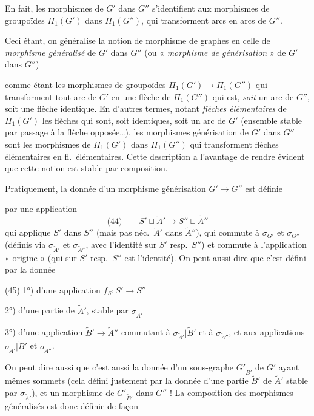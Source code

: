 \documentclass[11pt,a4paper]{article}
\begin{document}
En fait, les morphismes de $G'$ dans $G''$ s'identifient aux morphismes de groupoïdes $\Pi_1(G')$ dans $\Pi_1(G'')$, qui transforment arcs  en arcs de $G''$.

Ceci étant, on généralise la notion de morphisme de graphes en celle de \emph{morphisme généralisé} de $G'$ dans $G''$ (ou « \emph{morphisme de générisation} » de $G'$ dans $G''$)

comme étant les morphismes de groupoïdes $\Pi_1(G') \to \Pi_1(G'')$ qui transforment tout arc de $G'$ en une flèche de $\Pi_1(G'')$ qui est, \emph{soit} un arc de $G''$, soit une flèche identique. En d'autres termes, notant \emph{flèches élémentaires} de $\Pi_1(G')$ les flèches qui sont, soit identiques, soit un  arc de $G'$ (ensemble  stable par passage à la flèche opposée…), les morphismes  générisation de $G'$ dans $G''$ sont les morphismes de $\Pi_1(G')$ dans $\Pi_1(G'')$ qui transforment flèches élémentaires en fl.\ élémentaires. Cette description a l'avantage de rendre évident que cette notion est stable par composition.

Pratiquement, la donnée d'un morphisme  générisation  $G' \to G''$ est définie

par une application
\[
\text{(44)}\qquad S' \sqcup \tilde{A}' \longrightarrow S'' \sqcup \tilde{A}''
\]
qui applique $S'$ dans $S''$ (mais pas néc.\ $\tilde{A}'$ dans $\tilde{A}''$), qui commute à $\sigma_{G'}$ et $\sigma_{G''}$ (définis via $\sigma_{\tilde{A}'}$ et $\sigma_{\tilde{A}''}$, avec l'identité sur $S'$ resp.\ $S''$) et commute à l'application « origine » (qui sur $S'$ resp.\ $S''$ est l'identité). On peut aussi dire que c'est défini par la donnée

(45) 1°) d'une application $f_{S} : S' \to S''$

2°) d'une partie  de $\tilde{A}'$, stable par $\sigma_{\tilde{A}'}$

3°) d'une application $\tilde{B}' \to \tilde{A}''$ commutant à $\sigma_{\tilde{A}'} | \tilde{B}'$ et à $\sigma_{\tilde{A}''}$, et aux applications $o_{\tilde{A}'} | \tilde{B}'$ et $o_{\tilde{A}''}$.

On peut dire aussi que c'est aussi la donnée d'un sous-graphe $G'_{\tilde{B}'}$ de \struck{\ill{}} $G'$ ayant mêmes sommets (cela défini justement par la donnée d'une partie $\tilde{B}'$ de $\tilde{A}'$ stable par $\sigma_{\tilde{A}'}$), et un morphisme de $G'_{\tilde{B}'}$ dans $G''$ ! La composition des morphismes généralisés est donc définie de façon
\end{document}
